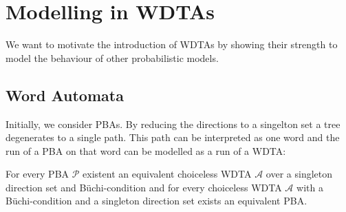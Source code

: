 \section{Modelling in \aclp{WDTA}}
We want to motivate the introduction of \acp{WDTA} by showing their strength to
model the behaviour of other probabilistic models. 
\subsection{Word Automata}
Initially, we consider \acp{PBA}. By reducing the directions to a 
singelton set a tree degenerates to a single path. This path can be interpreted 
as one word and the run of a \ac{PBA} on that word can be modelled as a run of 
a \ac{WDTA}:
\begin{theorem}
  For every \ac{PBA} $\mathcal{P}$ existent an equivalent choiceless \ac{WDTA}
  $\mathcal{A}$ over a singleton direction set and Büchi-condition and for 
  every choiceless \ac{WDTA} $\mathcal{A}$ with a Büchi-condition and a
  singleton direction set exists an equivalent \ac{PBA}.
  \label{thm:pbaaswdta}
\end{theorem}
